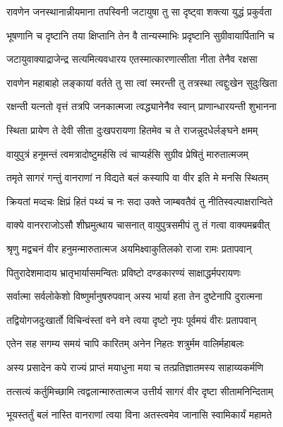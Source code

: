 \twolineshloka
{रावणेन जनस्थानान्नीयमाना तपस्विनी}
{जटायुषा तु सा दृष्ट्वा शक्त्या युद्धं प्रकुर्वता} %

\twolineshloka
{भूषणानि च दृष्टानि तया क्षिप्तानि तेन वै}
{तान्यस्माभिः प्रदृष्टानि सुग्रीवायार्पितानि च} %

\twolineshloka
{जटायुवाक्याद्राजेन्द्र सत्यमित्यवधारय}
{एतस्मात्कारणात्सीता नीता तेनैव रक्षसा} %

\twolineshloka
{रावणेन महाबाहो लङ्कायां वर्तते तु सा}
{त्वां स्मरन्ती तु तत्रस्था त्वद्दुःखेन सुदुःखिता} %

\twolineshloka
{रक्षन्ती यत्नतो वृत्तं तत्रपि जनकात्मजा}
{त्वद्ध्यानेनैव स्वान् प्राणान्धारयन्ती शुभानना} %

\twolineshloka
{स्थिता प्रायेण ते देवी सीता दुःखपरायणा}
{हितमेव च ते राजन्नुदधेर्लङ्घने क्षमम्} %

\twolineshloka
{वायुपुत्रं हनूमन्तं त्वमत्रादोष्टुमर्हसि}
{त्वं चाप्यर्हसि सुग्रीव प्रेषितुं मारुतात्मजम्} %

\twolineshloka
{तमृते सागरं गन्तुं वानराणां न विद्यते}
{बलं कस्यापि वा वीर इति मे मनसि स्थितम्} %

\twolineshloka
{क्रियतां मव्दचः क्षिप्रं हितं पथ्यं च नः सदा}
{उक्ते जाम्बवतैवं तु नीतिस्वल्पाक्षरान्विते} %

\twolineshloka
{वाक्ये वानरराजोऽसौ शीघ्रमुत्थाय चासनात्}
{वायुपुत्रसमीपं तु तं गत्वा वाक्यमब्रवीत्} %

\twolineshloka
{श्रृणु मद्वचनं वीर हनुमन्मारुतात्मज}
{अयमिक्ष्वाकुतिलको राजा रामः प्रतापवान्} %

\twolineshloka
{पितुरादेशमादाय भ्रातृभार्यासमन्वितः}
{प्रविष्टो दण्डकारण्यं साक्षाद्धर्मपरायणः} %

\twolineshloka
{सर्वात्मा सर्वलोकेशो विष्णुर्मानुषरुपवान्}
{अस्य भार्या हता तेन दुष्टेनापि दुरात्मना} %

\twolineshloka
{तद्वियोगजदुःखार्तो विचिन्वंस्तां वने वने}
{त्वया दृष्टो नृपः पूर्वमयं वीरः प्रतापवान्} %

\twolineshloka
{एतेन सह सगम्य समयं चापि कारितम्}
{अनेन निहतः शत्रुर्मम वालिर्महाबलः} %

\twolineshloka
{अस्य प्रसादेन कपे राज्यं प्राप्तं मयाधुना}
{मया च तत्प्रतिज्ञातमस्य साहाय्यकर्मणि} %

\twolineshloka
{तत्सत्यं कर्तुमिच्छामि त्वद्वलान्मारुतात्मज}
{उत्तीर्य सागरं वीर दृष्टा सीतामनिन्दिताम्} %

\twolineshloka
{भूयस्तर्तुं बलं नास्ति वानराणां त्वया विना}
{अतस्त्वमेव जानासि स्वामिकार्यं महामते} %

